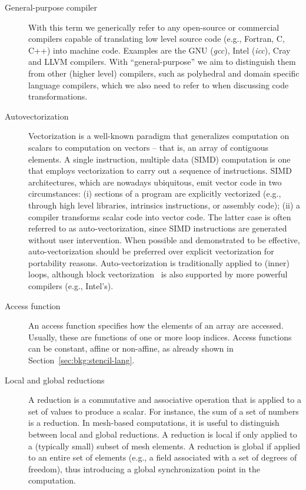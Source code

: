 \begin{description}
\item[General-purpose compiler] With this term we generically refer to any open-source or commercial compilers capable of translating low level source code (e.g., Fortran, C, C++) into machine code. Examples are the GNU ({\em gcc}), Intel ({\em icc}), Cray and LLVM compilers. With ``general-purpose'' we aim to distinguish them from other (higher level) compilers, such as polyhedral and domain specific language compilers, which we also need to refer to when discussing code transformations.

\item[Autovectorization] Vectorization is a well-known paradigm that generalizes computation on scalars to computation on vectors -- that is, an array of contiguous elements. A single instruction, multiple data (SIMD) computation is one that employs vectorization to carry out a sequence of instructions. SIMD architectures, which are nowadays ubiquitous, emit vector code in two circumstances: (i) sections of a program are explicitly vectorized (e.g., through high level libraries, intrinsics instructions, or assembly code); (ii) a compiler transforms scalar code into vector code. The latter case is often referred to as auto-vectorization, since SIMD instructions are generated without user intervention. When possible and demonstrated to be effective, auto-vectorization should be preferred over explicit vectorization for portability reasons. Auto-vectorization is traditionally applied to (inner) loops, although block vectorization~\cite{SLP-vect} is also supported by more powerful compilers (e.g., Intel's). 

\item[Access function] An access function specifies how the elements of an array are accessed. Usually, these are functions of one or more loop indices. Access functions can be constant, affine or non-affine, as already shown in Section~\ref{sec:bkg:stencil-lang}.

\item[Local and global reductions] A reduction is a commutative and associative operation that is applied to a set of values to produce a scalar. For instance, the sum of a set of numbers is a reduction. In mesh-based computations, it is useful to distinguish between local and global reductions. A reduction is local if only applied to a (typically small) subset of mesh elements. A reduction is global if applied to an entire set of elements (e.g., a field associated with a set of degrees of freedom), thus introducing a global synchronization point in the computation. 


\end{description}
